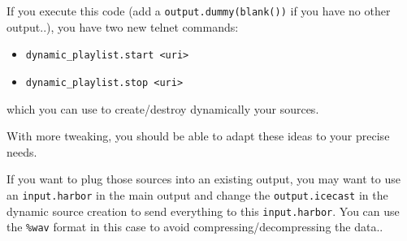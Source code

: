 If you execute this code (add a \verb+output.dummy(blank())+ if you have
no other output..), you have two new telnet commands:

\begin{itemize}
\item \verb+dynamic_playlist.start <uri>+
\item \verb+dynamic_playlist.stop <uri>+

\end{itemize}
which you can use to create/destroy dynamically your sources.

With more tweaking, you should be able to adapt these ideas to your
precise needs.

If you want to plug those sources into an existing output, you may
want to use an \verb+input.harbor+ in the main output and change the
\verb+output.icecast+ in the dynamic source creation to send everything to
this \verb+input.harbor+. You can use the \verb+%wav+ format in this case to avoid
compressing/decompressing the data..

